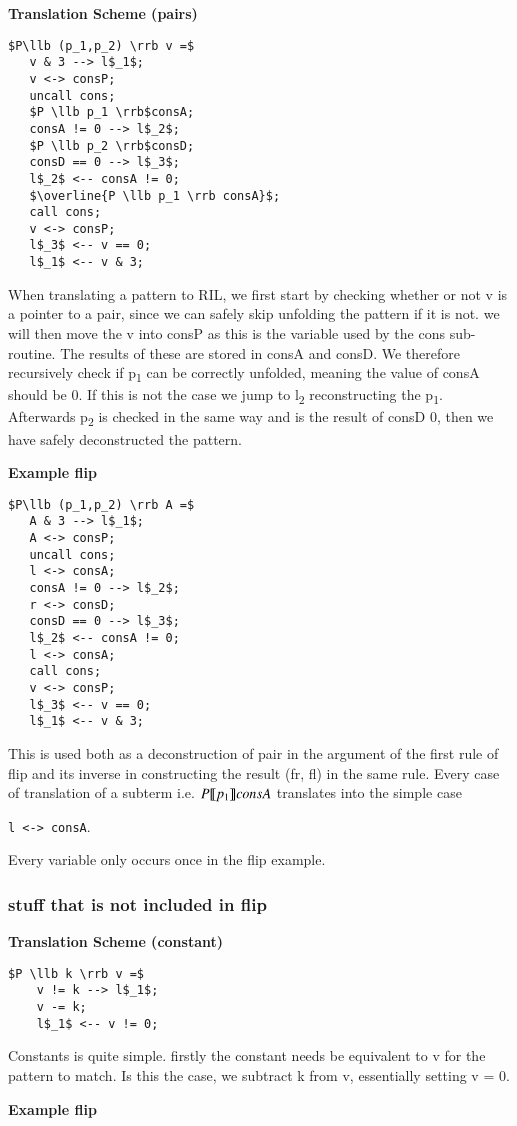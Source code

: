 \documentclass[a4paper]{article}
\begin{document}
\begin{minipage}[t]{0.6\textwidth}
\textbf{Translation Scheme (pairs)}
\begin{lstlisting}
$P\llb (p_1,p_2) \rrb v =$
   v & 3 --> l$_1$;
   v <-> consP;
   uncall cons;
   $P \llb p_1 \rrb$consA;
   consA != 0 --> l$_2$;
   $P \llb p_2 \rrb$consD;
   consD == 0 --> l$_3$;
   l$_2$ <-- consA != 0;
   $\overline{P \llb p_1 \rrb consA}$;
   call cons;
   v <-> consP;
   l$_3$ <-- v == 0;
   l$_1$ <-- v & 3;
\end{lstlisting}
When translating a pattern to RIL, we first start by checking whether or not v is a pointer to a pair, since we can safely skip unfolding the pattern if it is not. we will then move the v into consP as this is the variable used by the cons sub-routine. The results of these are stored in consA and consD. We therefore recursively check if p\textsubscript{1} can be correctly unfolded, meaning the value of consA should be 0. If this is not the case we jump to l\textsubscript{2} reconstructing the p\textsubscript{1}. Afterwards p\textsubscript{2} is checked in the same way and is the result of consD 0, then we have safely deconstructed the pattern.
\end{minipage}
\qquad
\begin{minipage}[t]{0.4\textwidth}
\textbf{Example flip}
\begin{lstlisting}
$P\llb (p_1,p_2) \rrb A =$
   A & 3 --> l$_1$;
   A <-> consP;
   uncall cons;
   l <-> consA;
   consA != 0 --> l$_2$;
   r <-> consD;
   consD == 0 --> l$_3$;
   l$_2$ <-- consA != 0;
   l <-> consA;
   call cons;
   v <-> consP;
   l$_3$ <-- v == 0;
   l$_1$ <-- v & 3;
\end{lstlisting}
This is used both as a deconstruction of pair in the argument of the first rule of flip and its inverse in constructing the result (fr, fl) in the same rule. Every case of translation of a subterm i.e. \(P \llbracket p_1 \rrbracket consA\) translates into the simple case

\texttt{l <-> consA}.

Every variable only occurs once in the flip example.
\end{minipage}
\subsubsection{stuff that is not included in flip}
\label{sec:org77e4660}
\begin{minipage}[t]{0.6\textwidth}
\textbf{Translation Scheme (constant)}
\begin{lstlisting}
$P \llb k \rrb v =$
    v != k --> l$_1$;
    v -= k;
    l$_1$ <-- v != 0;
\end{lstlisting}
Constants is quite simple. firstly the constant needs be equivalent to v for the pattern to match. Is this the case, we subtract k from v, essentially setting v = 0.
\end{minipage}
\qquad
\begin{minipage}[t]{0.4\textwidth}
\textbf{Example flip}
\end{minipage}
\end{document}

